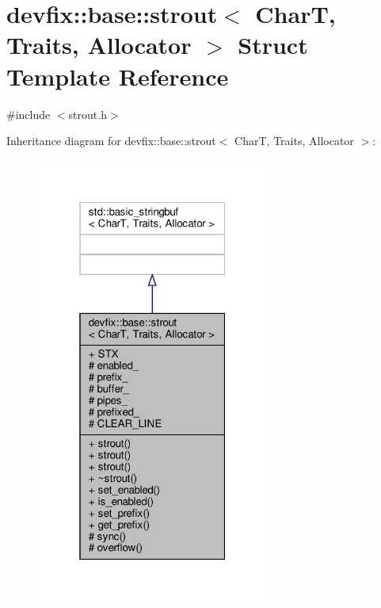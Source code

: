 \hypertarget{structdevfix_1_1base_1_1strout}{}\section{devfix\+:\+:base\+:\+:strout$<$ CharT, Traits, Allocator $>$ Struct Template Reference}
\label{structdevfix_1_1base_1_1strout}


{\ttfamily \#include $<$strout.\+h$>$}



Inheritance diagram for devfix\+:\+:base\+:\+:strout$<$ CharT, Traits, Allocator $>$\+:\nopagebreak
\begin{figure}[H]
\begin{center}
\leavevmode
\includegraphics[width=217pt]{structdevfix_1_1base_1_1strout__inherit__graph}
\end{center}
\end{figure}
